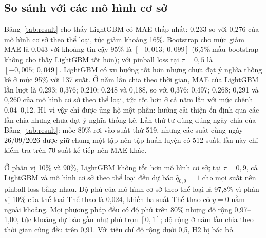 \documentclass{IEEEtran}
\begin{document}
\begin{table}[!t]
\caption{Kết quả trên tập kiểm tra (137 suất diễn)}
\label{tab:result}
\centering
\small
\setlength{\tabcolsep}{3pt}
\end{table}

\subsection{So sánh với các mô hình cơ sở}
Bảng~\ref{tab:result} cho thấy LightGBM có MAE thấp nhất: 0,233 so với 0,276 của mô hình cơ sở theo thể loại, tức giảm khoảng 16\%. Bootstrap cho mức giảm MAE là 0,043 với khoảng tin cậy 95\% là $[-0{,}013;\ 0{,}099]$ (6,5\% mẫu bootstrap không cho thấy LightGBM tốt hơn); với pinball loss tại $\tau = 0{,}5$ là $[-0{,}005;\ 0{,}049]$. LightGBM có xu hướng tốt hơn nhưng chưa đạt ý nghĩa thống kê ở mức 95\% với 137 suất. Ở năm lần chia theo thời gian, MAE của LightGBM lần lượt là 0,293; 0,376; 0,210; 0,248 và 0,188, so với 0,376; 0,497; 0,268; 0,291 và 0,260 của mô hình cơ sở theo thể loại, tức tốt hơn ở cả năm lần với mức chênh 0,04--0,12. H1 vì vậy chỉ được ủng hộ một phần: hướng cải thiện ổn định qua các lần chia nhưng chưa đạt ý nghĩa thống kê. Lần thứ tư dùng đúng ngày chia của Bảng~\ref{tab:result}: mốc 80\% rơi vào suất thứ 519, nhưng các suất cùng ngày 26/09/2026 được giữ chung một tập nên tập huấn luyện có 512 suất; lần này chỉ kiểm tra trên 70 suất kế tiếp nên MAE khác.

Ở phân vị 10\% và 90\%, LightGBM không tốt hơn mô hình cơ sở; tại $\tau = 0{,}9$, cả LightGBM và mô hình cơ sở theo thể loại đều dự báo $\hat{q}_{0{,}9} = 1$ cho mọi suất nên pinball loss bằng nhau. Độ phủ của mô hình cơ sở theo thể loại là 97,8\% vì phân vị 10\% của thể loại Thể thao là 0,024, khiến ba suất Thể thao có $y = 0$ nằm ngoài khoảng. Mọi phương pháp đều có độ phủ trên 80\% nhưng độ rộng 0,97--1,00, tức khoảng dự báo gần như phủ trọn $[0, 1]$; độ rộng ở năm lần chia theo thời gian cũng đều trên 0,91. Với tiêu chí độ rộng dưới 0,5, H2 bị bác bỏ.
\end{document}
